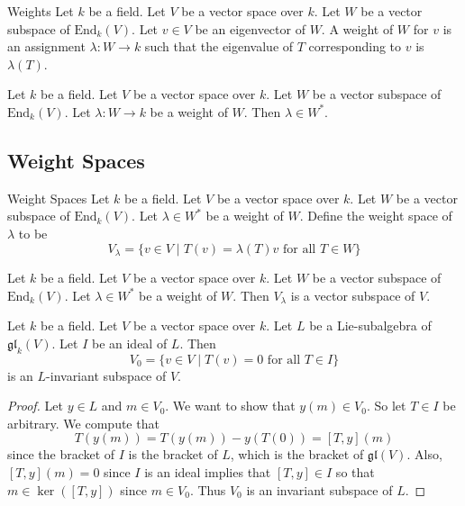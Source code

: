 \documentclass[a4paper]{article}
\begin{document}
\begin{defn}{Weights}{} Let $k$ be a field. Let $V$ be a vector space over $k$. Let $W$ be a vector subspace of $\text{End}_k(V)$. Let $v\in V$ be an eigenvector of $W$. A weight of $W$ for $v$ is an assignment $\lambda:W\to k$ such that the eigenvalue of $T$ corresponding to $v$ is $\lambda(T)$. 
\end{defn}

\begin{lmm}{}{} Let $k$ be a field. Let $V$ be a vector space over $k$. Let $W$ be a vector subspace of $\text{End}_k(V)$. Let $\lambda:W\to k$ be a weight of $W$. Then $\lambda\in W^\ast$. 
\end{lmm}

\subsection{Weight Spaces}
\begin{defn}{Weight Spaces}{} Let $k$ be a field. Let $V$ be a vector space over $k$. Let $W$ be a vector subspace of $\text{End}_k(V)$. Let $\lambda\in W^\ast$ be a weight of $W$. Define the weight space of $\lambda$ to be $$V_\lambda=\{v\in V\;|\;T(v)=\lambda(T)v\text{ for all }T\in W\}$$
\end{defn}

\begin{lmm}{}{} Let $k$ be a field. Let $V$ be a vector space over $k$. Let $W$ be a vector subspace of $\text{End}_k(V)$. Let $\lambda\in W^\ast$ be a weight of $W$. Then $V_\lambda$ is a vector subspace of $V$. 
\end{lmm}

\begin{prp}{}{} Let $k$ be a field. Let $V$ be a vector space over $k$. Let $L$ be a Lie-subalgebra of $\mathfrak{gl}_k(V)$. Let $I$ be an ideal of $L$. Then $$V_0=\{v\in V\;|\;T(v)=0\text{ for all }T\in I\}$$ is an $L$-invariant subspace of $V$. \tcbline
\begin{proof}
Let $y\in L$ and $m\in V_0$. We want to show that $y(m)\in V_0$. So let $T\in I$ be arbitrary. We compute that $$T(y(m))=T(y(m))-y(T(0))=[T,y](m)$$ since the bracket of $I$ is the bracket of $L$, which is the bracket of $\mathfrak{gl}(V)$. Also, $[T,y](m)=0$ since $I$ is an ideal implies that $[T,y]\in I$ so that $m\in\ker([T,y])$ since $m\in V_0$. Thus $V_0$ is an invariant subspace of $L$. 
\end{proof}
\end{prp}
\end{document}
